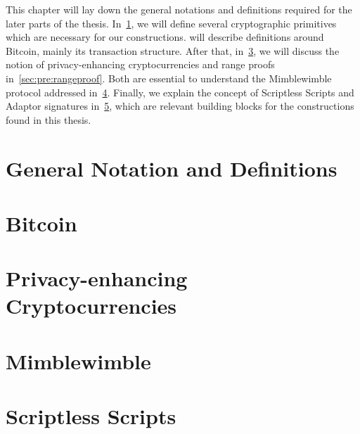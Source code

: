 This chapter will lay down the general notations and definitions required for the later parts of the thesis.
In~\cref{sec:pre:general}, we will define several cryptographic primitives which are necessary for our constructions.
 will describe definitions around Bitcoin, mainly its transaction structure.
After that, in~\cref{sec:pre:privacy}, we will discuss the notion of privacy-enhancing cryptocurrencies and range proofs in~\cref{sec:pre:rangeproof}.
Both are essential to understand the Mimblewimble protocol addressed in~\cref{sec:pre:mimblewimble}.
Finally, we explain the concept of Scriptless Scripts and Adaptor signatures in~\cref{sec:pre:scriptless-scripts}, which are relevant building blocks for the constructions found in this thesis.

\section{General Notation and Definitions}\label{sec:pre:general}


\section{Bitcoin} \label{sec:pre:bitcoin}


\section{Privacy-enhancing Cryptocurrencies} \label{sec:pre:privacy}


\section{Mimblewimble} \label{sec:pre:mimblewimble}


\section{Scriptless Scripts} \label{sec:pre:scriptless-scripts}


